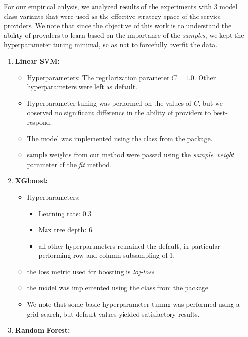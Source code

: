 For our empirical anlysis, we analyzed results of the experiments with 3 model class variants that were used as the effective strategy space of the service providers. We note that since the objective of this work is to understand the ability of providers to learn based on the importance of the \emph{samples}, we kept the hyperparameter tuning minimal, so as not to forcefully overfit the data.
\begin{enumerate}
    \item \textbf{Linear SVM:}
    \begin{itemize}
       
        \item Hyperparameters: The regularization parameter $C=1.0$. Other hyperparameters were left as default.
        \item Hyperparameter tuning was performed on the values of $C$, but we observed no significant difference in the ability of providers to best-respond.
        \item The model was implemented using the  class from the  package.
        \item sample weights from our method were passed using the \emph{sample weight} parameter of the \emph{fit} method.
    \end{itemize}
    \item \textbf{XGboost:}
    \begin{itemize}
        \item Hyperparameters:
    \begin{itemize}
        \item Learning rate: $0.3$
        \item Max tree depth: $6$
        \item all other hyperparameters remained the default, in particular performing row and column subsampling of 1.
    \end{itemize}
        \item the loss metric used for boosting is \emph{log-loss}
        \item the model was implemented using the  class from the  package
        \item We note that some basic hyperparameter tuning was performed using a grid search, but default values yielded satisfactory results.
    \end{itemize}
    \item \textbf{Random Forest:}
    \begin{itemize}

\end{itemize}
\end{enumerate}
